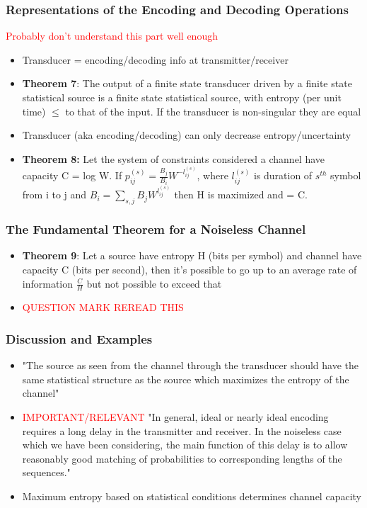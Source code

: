 \documentclass[leqno,twocolumn]{article}
\begin{document}
\subsubsection{Representations of the Encoding and Decoding Operations}
\textcolor{red}{Probably don't understand this part well enough}
\begin{itemize}
\item Transducer = encoding/decoding info at transmitter/receiver
\item \textbf{Theorem 7}: The output of a finite state transducer driven by a finite state statistical source is a finite state statistical source, with entropy (per unit time) $\leq$ to that of the input. If the transducer is non-singular they are equal 
\item Transducer (aka encoding/decoding) can only decrease entropy/uncertainty
\item \textbf{Theorem 8:} Let the system of constraints considered a channel have capacity C = log W. If $p^{(s)}_{ij} = \frac{B_j}{B_i} W^{-l^{(s)}_{ij}}$, where $l^{(s)}_{ij}$ is duration of $s^{th}$ symbol from i to j and $B_i = \sum_{s,j} B_jW^{l^{(s)}_{ij}}$ then H is maximized and = C. 
\end{itemize}

\subsubsection{The Fundamental Theorem for a Noiseless Channel}
\begin{itemize}
\item \textbf{Theorem 9}: Let a source have entropy H (bits per symbol) and channel have capacity C (bits per second), then it's possible to go up to an average rate of information $\frac{C}{H}$ but not possible to exceed that
\item \textcolor{red}{QUESTION MARK REREAD THIS}
\end{itemize}

\subsubsection{Discussion and Examples}
\begin{itemize}
\item "The source as seen from the channel through the transducer should have the same statistical structure as the source which maximizes the entropy of the channel"
\item \textcolor{red}{IMPORTANT/RELEVANT} "In general, ideal or nearly ideal encoding requires a long delay in the transmitter and receiver. In the noiseless case which we have been considering, the main function of this delay is to allow reasonably good matching of probabilities to corresponding lengths of the sequences."
\item Maximum entropy based on statistical conditions determines channel capacity
\end{itemize}
\end{document}

